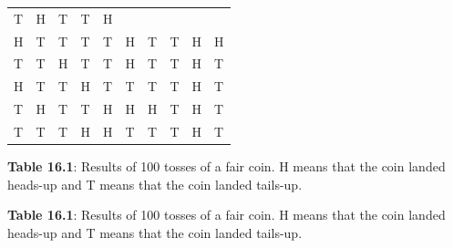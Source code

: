 \begin{description}[noitemsep]
\begin{description}[noitemsep]
\begin{table}
\begin{center}
\begin{xtabular}[t]{|l|l|l|l|l|l|l|l|l|l|}
        T &
        H &
        T &
        T &
        H%
     \tabularnewline{}
        H &
        T &
        T &
        T &
        T &
        H &
        T &
        T &
        H &
        H%
     \tabularnewline{}
        T &
        T &
        H &
        T &
        T &
        H &
        T &
        T &
        H &
        T%
     \tabularnewline{}
        H &
        T &
        T &
        H &
        T &
        T &
        T &
        T &
        H &
        T%
     \tabularnewline{}
        T &
        H &
        T &
        T &
        H &
        H &
        H &
        T &
        H &
        T%
     \tabularnewline{}
        T &
        T &
        T &
        H &
        H &
        T &
        T &
        T &
        H &
        T%
     \tabularnewline{}
    \end{xtabular}
      \end{center}
    \begin{center}{\small\bfseries Table 16.1}: Results of 100 tosses of a fair coin. H means that the coin landed heads-up and T means that the coin landed tails-up.\end{center}
    \begin{caption}{\small\bfseries Table 16.1}: Results of 100 tosses of a fair coin. H means that the coin landed heads-up and T means that the coin landed tails-up.\end{caption}
\end{table}
    \par
      \label{m39403*uid26}

\end{description}
\end{description}

